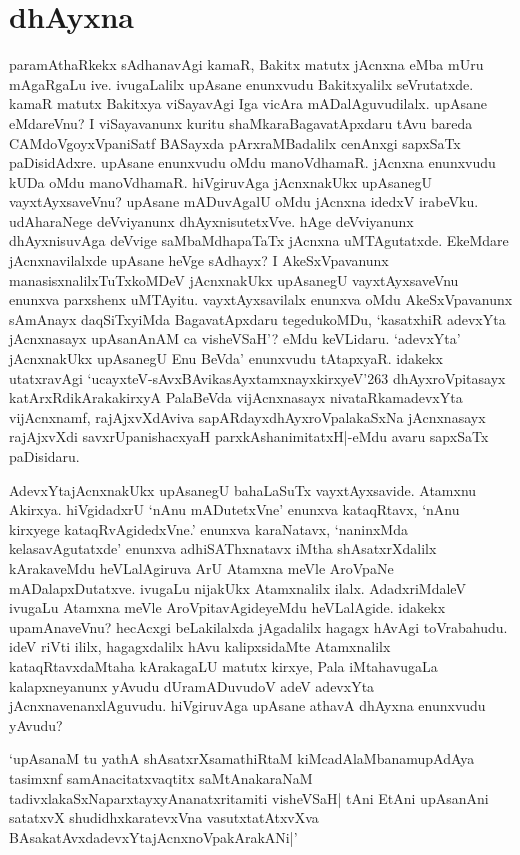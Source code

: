 \chapter{dhAyxna}\label{chap4}

paramAthaRkekx sAdhanavAgi kamaR, Bakitx matutx jAcnxna eMba mUru mAgaRgaLu ive. ivugaLalilx upAsane enunxvudu Bakitxyalilx seVrutatxde. kamaR matutx Bakitxya viSayavAgi Iga vicAra mADalAguvudilalx. upAsane eMdareVnu? I viSayavanunx kuritu shaMkaraBagavatApxdaru tAvu bareda CAMdoVgoyxVpaniSatf BASayxda pArxraMBadalilx cenAnxgi sapxSaTx paDisidAdxre. upAsane enunxvudu oMdu manoVdhamaR. jAcnxna enunxvudu kUDa oMdu manoVdhamaR. hiVgiruvAga jAcnxnakUkx upAsanegU vayxtAyxsaveVnu? upAsane mADuvAgalU oMdu jAcnxna idedxV irabeVku. udAharaNege deVviyanunx dhAyxnisutetxVve. hAge deVviyanunx dhAyxnisuvAga deVvige saMbaMdhapaTaTx jAcnxna uMTAgutatxde. EkeMdare jAcnxnavilalxde upAsane heVge sAdhayx? I AkeSxVpavanunx manasisxnalilxTuTxkoMDeV jAcnxnakUkx upAsanegU vayxtAyxsaveVnu enunxva parxshenx uMTAyitu. vayxtAyxsavilalx enunxva oMdu AkeSxVpavanunx sAmAnayx daqSiTxyiMda BagavatApxdaru tegedukoMDu, `kasatxhiR adevxYta jAcnxnasayx upAsanAnAM ca visheVSaH'? eMdu keVLidaru. `adevxYta' jAcnxnakUkx upAsanegU Enu BeVda' enunxvudu tAtapxyaR. idakekx utatxravAgi `ucayxteV-sAvxBAvikasAyxtamxnayxkirxyeV\char'263 dhAyxroVpitasayx katArxRdikArakakirxyA PalaBeVda vijAcnxnasayx nivataRkamadevxYta vijAcnxnamf, rajAjxvXdAviva sapARdayxdhAyxroVpalakaSxNa jAcnxnasayx rajAjxvXdi savxrUpanishacxyaH parxkAshanimitatxH|-eMdu avaru sapxSaTx paDisidaru.

AdevxYtajAcnxnakUkx upAsanegU bahaLaSuTx vayxtAyxsavide. Atamxnu Akirxya. hiVgidadxrU `nAnu mADutetxVne' enunxva kataqRtavx, `nAnu kirxyege kataqRvAgidedxVne.' enunxva karaNatavx, `naninxMda kelasavAgutatxde' enunxva adhiSAThxnatavx iMtha shAsatxrXdalilx kArakaveMdu heVLalAgiruva ArU Atamxna meVle AroVpaNe mADalapxDutatxve. ivugaLu nijakUkx Atamxnalilx ilalx. AdadxriMdaleV ivugaLu Atamxna meVle AroVpitavAgideyeMdu heVLalAgide. idakekx upamAnaveVnu? hecAcxgi beLakilalxda jAgadalilx hagagx hAvAgi toVrabahudu. ideV riVti ililx, hagagxdalilx hAvu kalipxsidaMte Atamxnalilx kataqRtavxdaMtaha kArakagaLU matutx kirxye, Pala iMtahavugaLa kalapxneyanunx yAvudu dUramADuvudoV adeV adevxYta jAcnxnavenanxlAguvudu. hiVgiruvAga upAsane athavA dhAyxna enunxvudu yAvudu?

`upAsanaM tu yathA shAsatxrXsamathiRtaM kiMcadAlaMbanamupAdAya tasimxnf samAnacitatxvaqtitx saMtAnakaraNaM tadivxlakaSxNaparxtayxyAnanatxritamiti visheVSaH| tAni EtAni upAsanAni satatxvX shudidhxkaratevxVna vasutxtatAtxvXva BAsakatAvxdadevxYtajAcnxnoVpakArakANi|'

